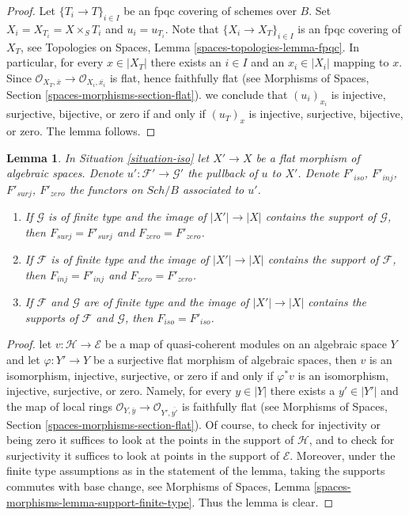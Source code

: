 \documentclass{stacks-project}
\theoremstyle{plain}
\newtheorem{lemma}[subsection]{Lemma}
\theoremstyle{definition}
\theoremstyle{remark}
\numberwithin{equation}{subsection}
\def\Sch{\mathit{Sch}}
\begin{document}
\begin{proof}
Let $\{T_i \to T\}_{i \in I}$ be an fpqc covering of schemes over $B$.
Set $X_i = X_{T_i} = X \times_S T_i$ and $u_i = u_{T_i}$.
Note that $\{X_i \to X_T\}_{i \in I}$ is an fpqc covering of $X_T$, see
Topologies on Spaces, Lemma \ref{spaces-topologies-lemma-fpqc}.
In particular, for every $x \in |X_T|$ there exists an $i \in I$
and an $x_i \in |X_i|$ mapping to $x$. Since
$\mathcal{O}_{X_T, \overline{x}} \to \mathcal{O}_{X_i, \overline{x_i}}$
is flat, hence faithfully flat (see
Morphisms of Spaces, Section \ref{spaces-morphisms-section-flat}).
we conclude that $(u_i)_{x_i}$ is injective, surjective, bijective, or zero
if and only if $(u_T)_x$ is injective, surjective, bijective, or zero.
The lemma follows.
\end{proof}

\begin{lemma}
\label{lemma-iso-go-up}
In Situation \ref{situation-iso} let $X' \to X$ be a flat morphism
of algebraic spaces. Denote $u' : \mathcal{F}' \to \mathcal{G}'$
the pullback of $u$ to $X'$. Denote $F'_{iso}$, $F'_{inj}$, $F'_{surj}$,
$F'_{zero}$ the functors on $\Sch/B$ associated to $u'$.
\begin{enumerate}
\item If $\mathcal{G}$ is of finite type and the image of $|X'| \to |X|$
contains the support of $\mathcal{G}$, then $F_{surj} = F'_{surj}$
and $F_{zero} = F'_{zero}$.
\item If $\mathcal{F}$ is of finite type and the image of $|X'| \to |X|$
contains the support of $\mathcal{F}$, then $F_{inj} = F'_{inj}$
and $F_{zero} = F'_{zero}$.
\item If $\mathcal{F}$ and $\mathcal{G}$ are of finite type and the image of
$|X'| \to |X|$ contains the supports of $\mathcal{F}$ and $\mathcal{G}$,
then $F_{iso} = F'_{iso}$.
\end{enumerate}
\end{lemma}

\begin{proof}
let $v : \mathcal{H} \to \mathcal{E}$ be a map of quasi-coherent
modules on an algebraic space $Y$ and let $\varphi : Y' \to Y$ be a
surjective flat morphism of algebraic spaces, then $v$ is
an isomorphism, injective, surjective, or zero if and only if $\varphi^*v$ is
an isomorphism, injective, surjective, or zero. Namely,
for every $y \in |Y|$ there exists a $y' \in |Y'|$ and the map
of local rings
$\mathcal{O}_{Y, \overline{y}} \to \mathcal{O}_{Y', \overline{y'}}$
is faithfully flat (see
Morphisms of Spaces, Section \ref{spaces-morphisms-section-flat}).
Of course, to check for injectivity or being zero it suffices to look
at the points in the support of $\mathcal{H}$, and to check for
surjectivity it suffices to look at points in the support of $\mathcal{E}$.
Moreover, under the finite type assumptions as in the statement of
the lemma, taking the supports commutes with base change, see
Morphisms of Spaces, Lemma \ref{spaces-morphisms-lemma-support-finite-type}.
Thus the lemma is clear.
\end{proof}
\end{document}
